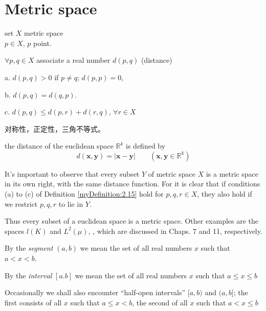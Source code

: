 \section{Metric space}
\begin{myDefinition}\label{myDefinition:2.15}
    set $X$ metric space\\
    $p\in X$, $p$ point.

    $\forall p,q \in X$ associate a real number $d(p,q)$ (distance)

    a. $d(p,q) > 0$ if $p \neq q$; $d(p,p)=0$,

    b. $d(p,q) = d(q,p)$.

    c. $d(p,q) \leq d(p,r) + d(r,q)$, $\forall r\in X$
\end{myDefinition}
对称性，正定性，三角不等式。

\begin{myExample}
    the distance of the euclidean space $\mathbb{R}^k$ is defined by
    \begin{equation}\label{eq:2.19 distance in eulidean space}
        d(\mathbf{x}, \mathbf{y}) = |\mathbf{x} - \mathbf{y}|
        \qquad (\mathbf{x}, \mathbf{y}\in \mathbb{R}^k)
    \end{equation}
\end{myExample}

It's important to observe that every subset $Y$ of metric space $X$ is a metric space in its own right, with the same distance function. For it is clear that if conditions (a) to (c) of Definition \ref{myDefinition:2.15} hold for $p, q, r \in X$, they also hold if we restrict $p, q, r$ to lie in $Y$.

Thus every subset of a euclidean space is a metric space. Other examples
are the spaces $l(K)$ and $L^2 (\mu)$, 
, which are discussed in Chaps. 7 and 11, respectively.

\begin{myDefinition}\label{myDefinition:2.17 segment}
By the \emph{segment} $(a, b)$ we mean the set of all real numbers $x$
such that $a < x <b$.

By the \emph{interval} $[a. b]$ we mean the set of all real numbers $x$ such that $a \leq x \leq b$

Occasionally we shall also encounter ``half-open intervals'' $[a, b)$ and $(a, b]$; the first consists of all $x$ such that $a \leq x < b$, the second of all $x$ such that $a < x \leq b$
\end{myDefinition}

